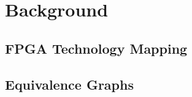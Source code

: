 \section{Background}\label{sec:background}

\subsection{FPGA Technology Mapping}\label{sec:background:fpga}

\subsection{Equivalence Graphs}\label{sec:background:egraph}
